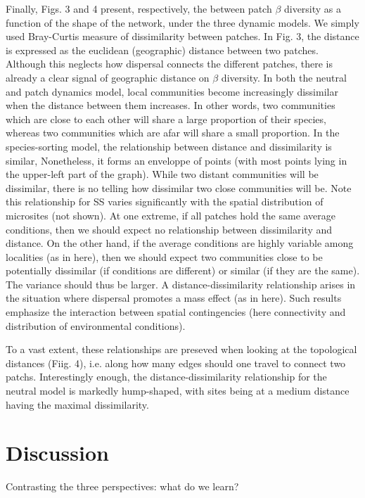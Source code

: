 \documentclass[12pt]{article}
\begin{document}
Finally, Figs. 3 and 4 present, respectively, the between patch $\beta$
diversity as a function of the shape of the network, under the three dynamic
models. We simply used Bray-Curtis measure of dissimilarity between patches.  In
Fig. 3, the distance is expressed as the euclidean (geographic) distance between
two patches. Although this neglects how dispersal connects the different
patches, there is already a clear signal of geographic distance on $\beta$
diversity. In both the neutral and patch dynamics model, local communities
become increasingly dissimilar when the distance between them increases. In
other words, two communities which are close to each other will share a large
proportion of their species, whereas two communities which are afar will share a
small proportion.  In the species-sorting model, the relationship between
distance and dissimilarity is similar, Nonetheless, it forms an enveloppe of
points (with most points lying in the upper-left part of the graph). While two
distant communities will be dissimilar, there is no telling how dissimilar two
close communities will be. Note this relationship for SS varies significantly
with the spatial distribution of microsites (not shown). At one extreme, if all
patches hold the same average conditions, then we should expect no relationship
between dissimilarity and distance. On the other hand, if the average conditions
are highly variable among localities (as in here), then we should expect two
communities close to be potentially dissimilar (if conditions are different) or
similar (if they are the same). The variance should thus be larger. A
distance-dissimilarity relationship arises in the situation where dispersal
promotes a mass effect (as in here). Such results emphasize the interaction
between spatial contingencies (here connectivity and distribution of
environmental conditions).  

To a vast extent, these relationships are preseved when looking at the
topological distances (Fiig. 4), i.e. along how many edges should one travel to connect
two patchs. Interestingly enough, the distance-dissimilarity relationship for
the neutral model is markedly hump-shaped, with sites being at a medium distance
having the maximal dissimilarity.

\section{Discussion}

Contrasting the three perspectives: what do we learn?
\end{document}
